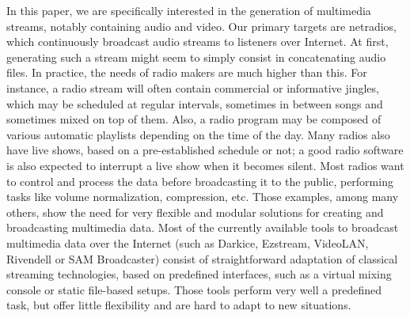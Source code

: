 \documentclass{llncs}
\begin{document}
In this paper,
we are specifically interested in the generation of multimedia streams,
notably containing audio and video.
Our primary targets are netradios, which continuously broadcast
audio streams to listeners over Internet.
At first, generating such a stream might seem to simply consist
in concatenating audio files. In practice, the needs of radio makers
are much higher than this.
For instance, a radio stream will often contain
commercial or informative jingles, which may be scheduled at regular
intervals, sometimes in between songs and sometimes mixed on top of them.
Also, a radio program may be composed of various automatic playlists
depending on the time of the day. Many radios also have live shows,
based on a pre-established schedule or not; a good radio software is also
expected to interrupt a live show when it becomes silent.
Most radios want to control and process the data before broadcasting
it to the public, performing tasks like volume normalization,
compression, etc.
Those examples, among many others, show the need for very flexible and modular
solutions for creating and broadcasting multimedia data. Most of the currently
available tools to broadcast multimedia data over the Internet (such as Darkice,
Ezstream, VideoLAN, Rivendell or SAM Broadcaster) consist of straightforward
adaptation of classical streaming technologies, based on
predefined interfaces, such as a virtual mixing console or static file-based
setups. Those tools perform very well a predefined task, but offer little
flexibility and are hard to adapt to new situations.
\end{document}
